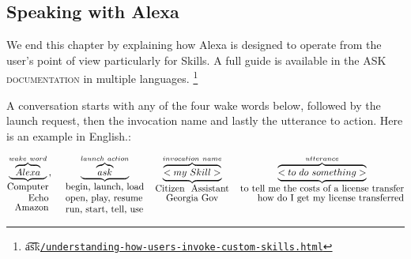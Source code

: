 


\subsection*{Speaking with Alexa}


We end this chapter by explaining how Alexa is designed to operate from the user's point of view particularly for Skills. A full guide is available in the \textsc{ASK documentation} in multiple languages. \footnote{\t{a\t{sk}}\href{https://developer.amazon.com/docs/custom-skills/understanding-how-users-invoke-custom-skills.html}{\lstinline|/understanding-how-users-invoke-custom-skills.html|}}

A conversation starts with any of the four wake words below, followed by the launch request, then the invocation name and lastly the utterance to action. Here is an example in English.:


\[
	\underbrace{\overbrace{Alexa}^{wake \  word}}_{\shortstack[r]{Computer\\Echo\\Amazon}} %
	, \ \ \ \ 
	\underbrace{\overbrace{ask}^{launch \ action}}_{\shortstack[l]{begin, launch, load\\open, play, resume\\run, start, tell, use}}
	\ \ \ 
	\underbrace{\overbrace{<my \ Skill>}^{invocation \ name}}_{\shortstack{Citizen \ Assistant \\ Georgia Gov}}
	\ \ \
	\underbrace{\overbrace{<to \ do \ something>}^{utterance}}_{\shortstack[r]{to tell me the costs of a license transfer\\how do I get my license transferred}}
\]














